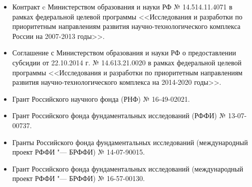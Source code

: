 \begin{itemize}
    \item Контракт c Министерством образования и науки РФ № 14.514.11.4071 в рамках федеральной целевой программы <<Исследования и разработки по приоритетным направлениям развития научно-технологического комплекса России на 2007-2013 годы>>.
	\item Соглашение с Министерством образования и науки РФ о предоставлении субсидии от 22.10.2014 г. № 14.613.21.0020 в рамках федеральной целевой программы <<Исследования и разработки по приоритетным направлениям развития научно-технологического комплекса на 2014-2020 годы>>.
	\item Грант Российского научного фонда (РНФ) № 16-49-02021.
	\item Грант Российского фонда фундаментальных исследований (РФФИ) № 13-07-00737.
	\item Гранты Российского фонда фундаментальных исследований (международный проект РФФИ "--- БРФФИ) № 14-07-90015.
	\item Грант Российского фонда фундаментальных исследований (международный проект РФФИ "--- БРФФИ) № 16-57-00130.


\end{itemize}
